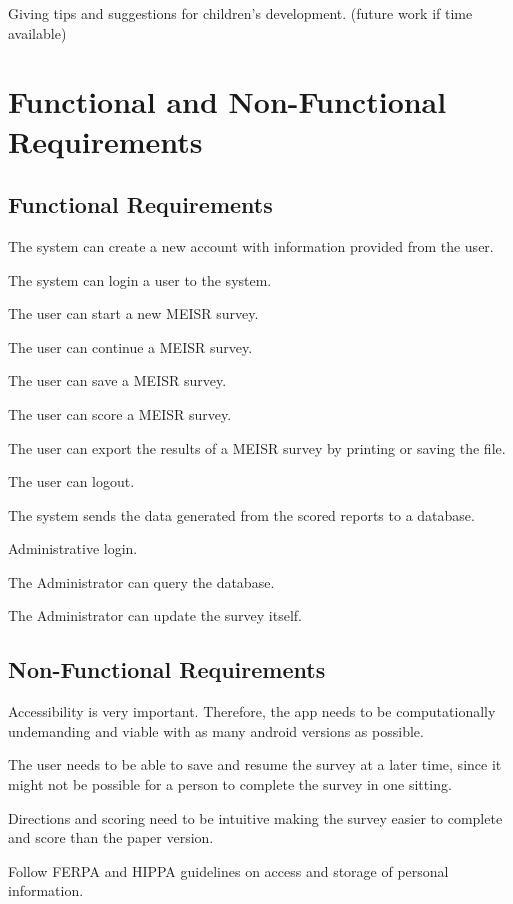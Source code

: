 Giving tips and suggestions for children’s development. (future work if time available)



\chapter{Functional and Non-Functional Requirements}
\label{ch:Functional and Non-Functional Requirements}

\section{Functional Requirements}

The system can create a new account with information provided from the user.

The system can login a user to the system.

The user can start a new MEISR survey.

The user can continue a MEISR survey.

The user can save a MEISR survey.

The user can score a MEISR survey.

The user can export the results of a MEISR survey by printing or saving the file.

The user can logout.

The system sends the data generated from the scored reports to a database.

Administrative login.

The Administrator can query the database.

The Administrator can update the survey itself.

\section{Non-Functional Requirements}


Accessibility is very important. Therefore, the app needs to be computationally undemanding and viable with as many android versions as possible.

The user needs to be able to save and resume the survey at a later time, since it might not be possible for a person to complete the survey in one sitting.

Directions and scoring need to be intuitive making the survey easier to complete and score than the paper version.

Follow FERPA and HIPPA guidelines on access and storage of personal information.

